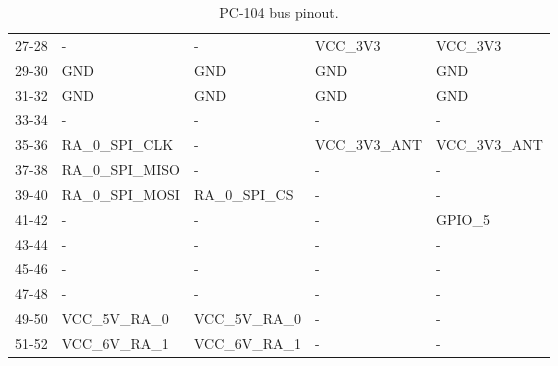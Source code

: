 \begin{table}[!ht]
\begin{tabular}{cllll}
        27-28              & -                & -                & VCC\_3V3         & VCC\_3V3         \\
        29-30              & GND              & GND              & GND              & GND              \\
        31-32              & GND              & GND              & GND              & GND              \\
        33-34              & -                & -                & -                & -                \\
        35-36              & RA\_0\_SPI\_CLK  & -                & VCC\_3V3\_ANT    & VCC\_3V3\_ANT    \\
        37-38              & RA\_0\_SPI\_MISO & -                & -                & -                \\
        39-40              & RA\_0\_SPI\_MOSI & RA\_0\_SPI\_CS   & -                & -                \\
        41-42              & -                & -                & -                & GPIO\_5          \\
        43-44              & -                & -                & -                & -                \\
        45-46              & -                & -                & -                & -                \\
        47-48              & -                & -                & -                & -                \\
        49-50              & VCC\_5V\_RA\_0   & VCC\_5V\_RA\_0   & -                & -                \\
        51-52              & VCC\_6V\_RA\_1   & VCC\_6V\_RA\_1   & -                & -                \\
        \bottomrule[1.5pt]
    \end{tabular}
    \caption{PC-104 bus pinout.}
    \label{tab:pc104-pinout}
\end{table}


